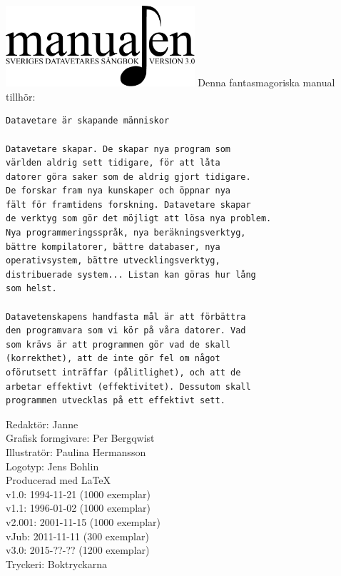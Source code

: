 \documentclass[a6paper,fontsize=10pt,twoside,open=right]{scrbook}
\makeatletter
\def\cleardoublepage{%
  \ifodd\c@page%
  \else%
    \ohead{}%
    \null%
    \newpage%
  \fi%
}%
\makeatother
\begin{document}
\vspace*{6.5cm}
\hspace*{0.9cm}
\includegraphics[keepaspectratio,width=7cm]{elements/logo.pdf}
\clearpage
\noindent Denna fantasmagoriska manual tillhör:
\ohead{\textnormal{\textsc{\scriptsize\leftmark}}}
\ofoot[\pagemark]{\textsc{\scriptsize\pagemark}}
\clearpage
{}
{\small\begin{verbatim}
Datavetare är skapande människor

Datavetare skapar. De skapar nya program som
världen aldrig sett tidigare, för att låta
datorer göra saker som de aldrig gjort tidigare.
De forskar fram nya kunskaper och öppnar nya
fält för framtidens forskning. Datavetare skapar
de verktyg som gör det möjligt att lösa nya problem.
Nya programmeringsspråk, nya beräkningsverktyg,
bättre kompilatorer, bättre databaser, nya
operativsystem, bättre utvecklingsverktyg,
distribuerade system... Listan kan göras hur lång
som helst.
  
Datavetenskapens handfasta mål är att förbättra
den programvara som vi kör på våra datorer. Vad
som krävs är att programmen gör vad de skall
(korrekthet), att de inte gör fel om något
oförutsett inträffar (pålitlighet), och att de
arbetar effektivt (effektivitet). Dessutom skall
programmen utvecklas på ett effektivt sett.
\end{verbatim}}
\vspace{10pt}
\clearpage
\setlength{\parindent}{15pt}
\null
\vfill
    {\noindent\small\centering
      Redaktör: Janne\\
      Grafisk formgivare: Per Bergqwist\\
      Illustratör: Paulina Hermansson\\
      Logotyp: Jens Bohlin\\
      Producerad med \LaTeX\\
      v1.0: 1994-11-21 (1000 exemplar)\\
      v1.1: 1996-01-02 (1000 exemplar)\\
      v2.001: 2001-11-15 (1000 exemplar)\\
      vJub: 2011-11-11 (300 exemplar)\\
      v3.0: 2015-??-?? (1200 exemplar)\\
      Tryckeri: Boktryckarna\par
    }
\cleardoublepage
\end{document}
